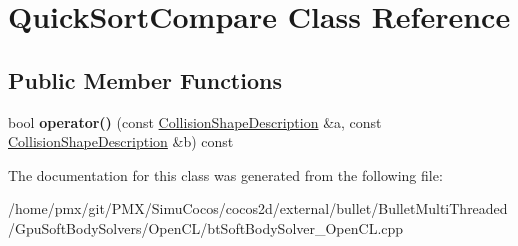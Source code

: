 \hypertarget{classQuickSortCompare}{}\section{Quick\+Sort\+Compare Class Reference}
\label{classQuickSortCompare}
\subsection*{Public Member Functions}
\begin{DoxyCompactItemize}
\item 
\mbox{\label{classQuickSortCompare_a71c47ef06444d38816456a0f73d5af94}} 
bool {\bfseries operator()} (const \hyperlink{structCollisionShapeDescription}{Collision\+Shape\+Description} \&a, const \hyperlink{structCollisionShapeDescription}{Collision\+Shape\+Description} \&b) const
\end{DoxyCompactItemize}


The documentation for this class was generated from the following file\+:\begin{DoxyCompactItemize}
\item 
/home/pmx/git/\+P\+M\+X/\+Simu\+Cocos/cocos2d/external/bullet/\+Bullet\+Multi\+Threaded/\+Gpu\+Soft\+Body\+Solvers/\+Open\+C\+L/bt\+Soft\+Body\+Solver\+\_\+\+Open\+C\+L.\+cpp\end{DoxyCompactItemize}
